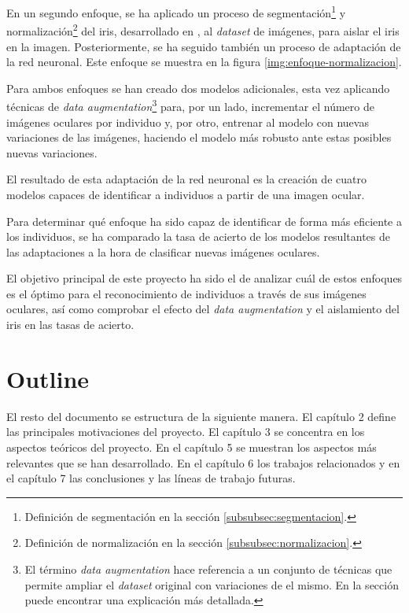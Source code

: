 En un segundo enfoque, se ha aplicado un proceso de segmentación\footnote{Definición de segmentación en la sección \ref{subsubsec:segmentacion}.} y normalización\footnote{Definición de normalización en la sección \ref{subsubsec:normalizacion}.} del iris, desarrollado en \cite{tfg_iris_2020}, al \textit{dataset} de imágenes, para aislar el iris en la imagen. Posteriormente, se ha seguido también un proceso de adaptación de la red neuronal. Este enfoque se muestra en la figura \ref{img:enfoque-normalizacion}.



Para ambos enfoques se han creado dos modelos adicionales, esta vez aplicando técnicas de \textit{data augmentation}\footnote{El término \textit{data augmentation} hace referencia a un conjunto de técnicas que permite ampliar el \textit{dataset} original con variaciones de el mismo. En la sección  puede encontrar una explicación más detallada.} para, por un lado, incrementar el número de imágenes oculares por individuo y, por otro, entrenar al modelo con nuevas variaciones de las imágenes, haciendo el modelo más robusto ante estas posibles nuevas variaciones.

El resultado de esta adaptación de la red neuronal es la creación de cuatro modelos capaces de identificar a individuos a partir de una imagen ocular. 

Para determinar qué enfoque ha sido capaz de identificar de forma más eficiente a los individuos, se ha comparado la tasa de acierto de los modelos resultantes de las adaptaciones a la hora de clasificar nuevas imágenes oculares. 

El objetivo principal de este proyecto ha sido el de analizar cuál de estos enfoques es el óptimo para el reconocimiento de individuos a través de sus imágenes oculares, así como comprobar el efecto del \textit{data augmentation } y el aislamiento del iris en las tasas de acierto.

\section{Outline}

El resto del documento se estructura de la siguiente manera. El capítulo 2  define las principales motivaciones del proyecto. El capítulo 3  se concentra en los aspectos teóricos del proyecto. En el capítulo 5  se muestran los aspectos
más relevantes que se han desarrollado. En el capítulo 6  los trabajos relacionados y en el capítulo 7  las conclusiones y las líneas de trabajo futuras.
